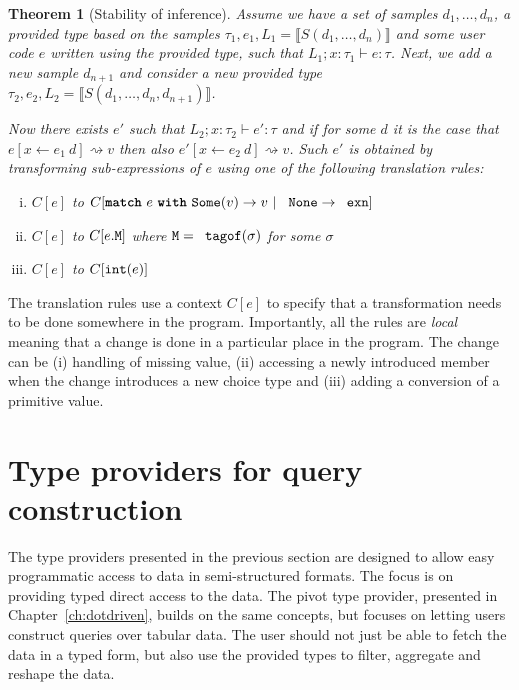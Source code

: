 \documentclass[fleqn,11pt]{report}
\newcommand{\kvd}[1]{\textnormal{\ttfamily\bfseries #1}}
\newcommand{\ident}[1]{\textnormal{\ttfamily #1}}
\newtheorem{theorem}{Theorem}
\theoremstyle{definition}
\newcommand{\tytagof}{\ident{tagof}}
\newcommand{\reduce}{\rightsquigarrow}
\newcommand{\sem}[1]{\llbracket #1 \rrbracket}
\newcommand{\semalt}[1]{S(#1)}
\begin{document}
\begin{theorem}[Stability of inference]
Assume we have a set of samples $d_1, \ldots, d_n$, a provided type based on the samples
$\tau_1, e_1, L_1 = \sem{\semalt{d_1, \ldots, d_n}}$ and some user code $e$ written using
the provided type, such that $L_1; x:\tau_1\vdash e : \tau$.
%
Next, we add a new sample $d_{n+1}$ and consider a new provided type
$\tau_2, e_2, L_2 = \sem{\semalt{d_1, \ldots, d_n, d_{n+1}}}$.

Now there exists $e'$ such that $L_2; x:\tau_2\vdash e' : \tau$ and if
for some $d$ it is the case that $e[x\leftarrow e_1~d] \reduce v$ then
also $e'[x\leftarrow e_2~d] \reduce v$.
%
Such $e'$ is obtained by transforming sub-expressions of $e$ using one of the following
translation rules:
%
\vspace{-0.1em}
\begin{enumerate}[(i)]
\itemsep -0.1em
\item $C[e]$ to $C[\kvd{match}~e~\kvd{with}~\ident{Some}(v) \rightarrow v~|~\ident{None} \rightarrow \ident{exn}]$
\item $C[e]$ to $C[e.\ident{M}]$ where $\ident{M} = \tytagof(\sigma)$ for some $\sigma$
\item $C[e]$ to $C[\ident{int}(e)]$
\end{enumerate}
\end{theorem}
%
The translation rules use a context $C[e]$ to specify that a transformation needs to be done
somewhere in the program. Importantly, all the rules are \emph{local} meaning that a change
is done in a particular place in the program. The change can be (i) handling of missing value,
(ii) accessing a newly introduced member when the change introduces a new choice type
and (iii) adding a conversion of a primitive value.

\section{Type providers for query construction}
\label{sec:tp-query}

The type providers presented in the previous section are designed to allow easy programmatic
access to data in semi-structured formats. The focus is on providing typed direct access to the
data. The pivot type provider, presented in Chapter~\ref{ch:dotdriven}, builds on the same
concepts, but focuses on letting users construct queries over tabular data. The user should not
just be able to fetch the data in a typed form, but also use the provided types to filter,
aggregate and reshape the data.
\end{document}

